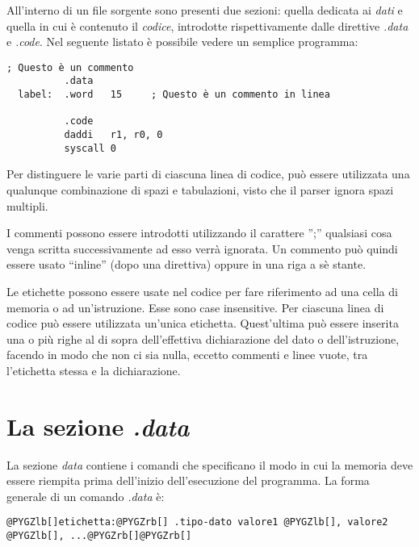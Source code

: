 \documentclass[letterpaper,10pt,italian]{sphinxmanual}
\begin{document}
All'interno di un file sorgente sono presenti due sezioni: quella dedicata ai
\emph{dati} e quella in cui è contenuto il \emph{codice}, introdotte rispettivamente
dalle direttive \emph{.data} e \emph{.code}. Nel seguente listato è possibile vedere un
semplice programma:

\begin{Verbatim}[commandchars=@\[\]]
; Questo è un commento
          .data
  label:  .word   15     ; Questo è un commento in linea

          .code
          daddi   r1, r0, 0
          syscall 0
\end{Verbatim}

Per distinguere le varie parti di ciascuna linea di codice, può essere
utilizzata una qualunque combinazione di spazi e tabulazioni, visto che il
parser ignora spazi multipli.

I commenti possono essere introdotti utilizzando il carattere '';'' qualsiasi
cosa venga scritta successivamente ad esso verrà ignorata.  Un commento
può quindi essere usato ``inline'' (dopo una direttiva) oppure in una riga a
sè stante.

Le etichette possono essere usate nel codice per fare riferimento ad una cella
di memoria o ad un'istruzione.  Esse sono case insensitive. Per ciascuna linea
di codice può essere utilizzata un'unica etichetta. Quest'ultima può essere
inserita una o più righe al di sopra dell'effettiva dichiarazione del dato
o dell'istruzione, facendo in modo che non ci sia nulla, eccetto commenti e
linee vuote, tra l'etichetta stessa e la dichiarazione.


\section{La sezione \emph{.data}}
\label{source-files-format:la-sezione-data}
La sezione \emph{data} contiene i comandi che specificano il modo in cui la
memoria deve essere riempita prima dell'inizio dell'esecuzione del programma. La
forma generale di un comando \emph{.data} è:

\begin{Verbatim}[commandchars=@\[\]]
@PYGZlb[]etichetta:@PYGZrb[] .tipo-dato valore1 @PYGZlb[], valore2 @PYGZlb[], ...@PYGZrb[]@PYGZrb[]
\end{Verbatim}
\end{document}
